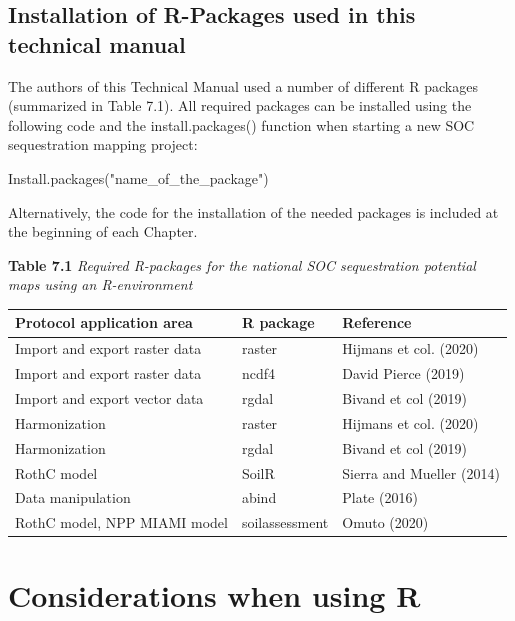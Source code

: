 \documentclass[
  10pt,
  b5paper,
]{book}
\newenvironment{Shaded}{\begin{snugshade}}{\end{snugshade}}
\newcommand{\FunctionTok}[1]{\textcolor[rgb]{0.00,0.00,0.00}{#1}}
\newcommand{\NormalTok}[1]{#1}
\newcommand{\StringTok}[1]{\textcolor[rgb]{0.31,0.60,0.02}{#1}}
\begin{document}
\hypertarget{installation-of-r-packages-used-in-this-technical-manual}{%
\subsection{Installation of R-Packages used in this technical manual}\label{installation-of-r-packages-used-in-this-technical-manual}}

The authors of this Technical Manual used a number of different R packages (summarized in Table 7.1). All required packages can be installed using the following code and the install.packages() function when starting a new SOC sequestration mapping project:

\begin{Shaded}
\begin{Highlighting}[]
\FunctionTok{Install.packages}\NormalTok{(}\StringTok{"name\_of\_the\_package"}\NormalTok{)}
\end{Highlighting}
\end{Shaded}

Alternatively, the code for the installation of the needed packages is included at the beginning of each Chapter.

\textbf{Table 7.1} \emph{Required R-packages for the national SOC sequestration potential maps using an R-environment}

\begin{table}
\centering
\begin{tabular}{l|l|l}
\hline
Protocol application area & R package & Reference\\
\hline
Import and export raster data & raster & Hijmans et col. (2020)\\
\hline
Import and export raster data & ncdf4 & David Pierce (2019)\\
\hline
Import and export vector data & rgdal & Bivand et col (2019)\\
\hline
Harmonization & raster & Hijmans et col. (2020)\\
\hline
Harmonization & rgdal & Bivand et col (2019)\\
\hline
RothC model & SoilR & Sierra and Mueller (2014)\\
\hline
Data manipulation & abind & Plate (2016)\\
\hline
RothC model, NPP MIAMI model & soilassessment & Omuto (2020)\\
\hline
\end{tabular}
\end{table}

\hypertarget{considerations-when-using-r}{%
\section{Considerations when using R}\label{considerations-when-using-r}}
\end{document}
